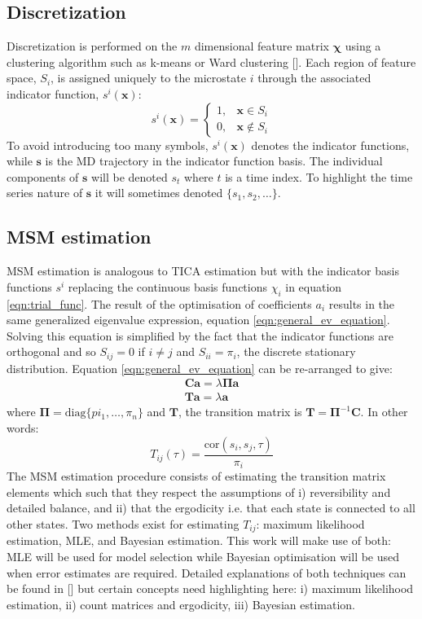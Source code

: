 \subsection{Discretization}
Discretization is performed on the $m$ dimensional feature matrix $\bm{\chi}$ using a clustering algorithm such as k-means or Ward clustering []. Each region of feature space, $S_{i}$, is assigned uniquely to the microstate $i$ through the associated indicator function, $s^{i}(\mathbf{x})$:
\begin{equation}
s^{i}(\mathbf{x})=\left\{\begin{array}{ll}
1, & \mathbf{x} \in S_{i} \\
0, & \mathbf{x} \notin S_{i}
\end{array}\right.
\end{equation}
To avoid introducing too many symbols, $s^{i}(\mathbf{x})$ denotes the indicator functions, while $\mathbf{s}$ is the MD trajectory in the indicator function basis. The individual components of $\mathbf{s}$ will be denoted $s_{t}$ where $t$ is a time index. To highlight the time series nature of $\mathbf{s}$ it will sometimes denoted $\{s_{1}, s_{2}, \ldots \}$. 

\subsection{MSM estimation}
MSM estimation is analogous to TICA estimation but with the indicator basis functions $s^{i}$ replacing the continuous basis functions $\chi_{i}$ in equation \ref{eqn:trial_func}. The result of the optimisation of coefficients $a_{i}$ results in the same generalized eigenvalue expression, equation \ref{eqn:general_ev_equation}. Solving this equation is simplified by the fact that the indicator functions are orthogonal and so $S_{ij} = 0$ if $i \neq j$ and $S_{ii} = \pi_{i}$, the discrete stationary distribution. Equation \ref{eqn:general_ev_equation} can be re-arranged to give: 
\begin{align}
 \mathbf{C a}=\lambda \bm{\Pi} \mathbf{a} \\
\mathbf{T a}=\lambda \mathbf{a}   
\end{align}
where $\bm{\Pi} = \mathrm{diag}\{pi_{1}, \ldots, \pi_{n}\}$ and $\mathbf{T}$, the transition matrix is $\mathbf{T} = \bm{\Pi}^{-1}\mathbf{C}$. In other words: 
\begin{equation}\label{eqn:tran_mat_def}
    T_{ij}(\tau) =\frac{\mathrm{cor}(s_{i}, s_{j}, \tau)}{\pi_{i}}
\end{equation}
The MSM estimation procedure consists of estimating the transition matrix elements which such that they respect the assumptions of i) reversibility and detailed balance, and ii) that the ergodicity i.e. that each state is connected to all other states. Two methods exist for estimating $T_{ij}$: maximum likelihood estimation, MLE, and Bayesian estimation. This work will make use of both: MLE will be used for model selection while Bayesian optimisation will be used when error estimates are required.  Detailed explanations of both  techniques can be found in [] but certain concepts need highlighting here: i) maximum likelihood estimation, ii) count matrices and ergodicity, iii) Bayesian estimation. 

